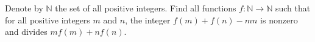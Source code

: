 Denote by 
$\mathbb{N}$
 the set of all positive integers. Find all functions 
$f:\mathbb{N}\rightarrow \mathbb{N}$
 such that for all positive integers 
$m$
 and 
$n$, 
 the integer 
$f(m)+f(n)-mn$
 is nonzero and divides 
$mf(m)+nf(n)$.

